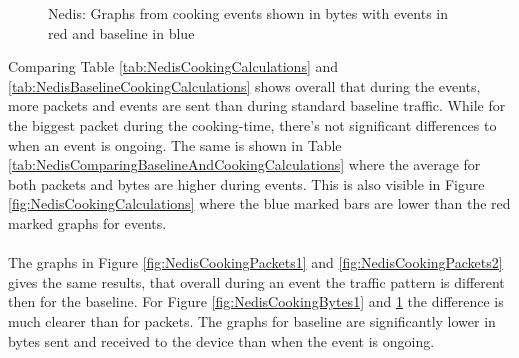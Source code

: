 \begin{figure}[H]
\begin{subfigure}[b]{0.47\textwidth}
    \end{subfigure}
        \begin{subfigure}[b]{0.47\textwidth}
        \centering
    \end{subfigure}
    \begin{subfigure}[b]{0.47\textwidth}
        \centering
    \end{subfigure}
    \begin{subfigure}[b]{0.47\textwidth}
        \centering
    \end{subfigure}
    \hspace{0.6cm}
    \begin{subfigure}[b]{0.47\textwidth}
    \centering
        \end{subfigure}
    \caption{Nedis: Graphs from cooking events shown in bytes with events in red and baseline in blue}
    \label{fig:NedisCookingBytes2}
\end{figure}

Comparing Table \ref{tab:NedisCookingCalculations} and \ref{tab:NedisBaselineCookingCalculations} shows overall that during the events, more packets and events are sent than during standard baseline traffic. While for the biggest packet during the cooking-time, there's not significant differences to when an event is ongoing. The same is shown in Table \ref{tab:NedisComparingBaselineAndCookingCalculations} where the average for both packets and bytes are higher during events. This is also visible in Figure \ref{fig:NedisCookingCalculations} where the blue marked bars are lower than the red marked graphs for events. 
\\\\
The graphs in Figure \ref{fig:NedisCookingPackets1} and \ref{fig:NedisCookingPackets2} gives the same results, that overall during an event the traffic pattern is different then for the baseline. For Figure \ref{fig:NedisCookingBytes1} and \ref{fig:NedisCookingBytes2} the difference is much clearer than for packets. The graphs for baseline are significantly lower in bytes sent and received to the device than when the event is ongoing. 

